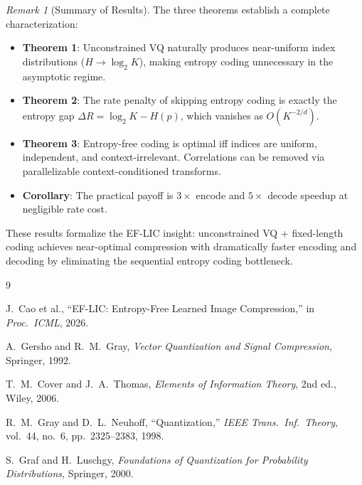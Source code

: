 \documentclass[11pt,a4paper]{article}
\theoremstyle{definition}
\theoremstyle{remark}
\newtheorem{remark}[theorem]{Remark}
\begin{document}
\begin{remark}[Summary of Results]
The three theorems establish a complete characterization:

\begin{itemize}[nosep]
  \item \textbf{Theorem 1}: Unconstrained VQ naturally produces near-uniform
        index distributions ($H \to \log_2 K$), making entropy coding
        unnecessary in the asymptotic regime.
  \item \textbf{Theorem 2}: The rate penalty of skipping entropy coding is
        exactly the entropy gap $\Delta R = \log_2 K - H(p)$, which vanishes
        as $O(K^{-2/d})$.
  \item \textbf{Theorem 3}: Entropy-free coding is optimal iff indices are
        uniform, independent, and context-irrelevant. Correlations can be
        removed via parallelizable context-conditioned transforms.
  \item \textbf{Corollary}: The practical payoff is $3\times$ encode and
        $5\times$ decode speedup at negligible rate cost.
\end{itemize}

These results formalize the EF-LIC insight: unconstrained VQ + fixed-length
coding achieves near-optimal compression with dramatically faster encoding
and decoding by eliminating the sequential entropy coding bottleneck.
\end{remark}

\begin{thebibliography}{9}

J.~Cao et al.,
\newblock ``EF-LIC: Entropy-Free Learned Image Compression,''
\newblock in \emph{Proc.\ ICML}, 2026.

A.~Gersho and R.~M.~Gray,
\newblock \emph{Vector Quantization and Signal Compression},
\newblock Springer, 1992.

T.~M.~Cover and J.~A.~Thomas,
\newblock \emph{Elements of Information Theory},
\newblock 2nd ed., Wiley, 2006.

R.~M.~Gray and D.~L.~Neuhoff,
\newblock ``Quantization,''
\newblock \emph{IEEE Trans.\ Inf.\ Theory}, vol.~44, no.~6, pp.~2325--2383, 1998.

S.~Graf and H.~Luschgy,
\newblock \emph{Foundations of Quantization for Probability Distributions},
\newblock Springer, 2000.

\end{thebibliography}
\end{document}
